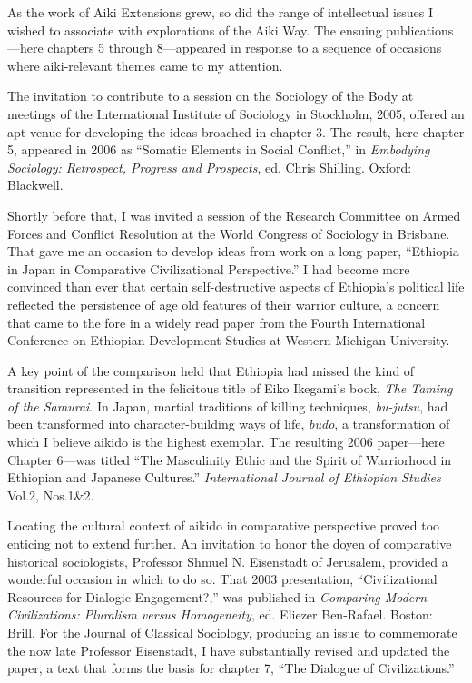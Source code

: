 As the work of Aiki Extensions grew, so did the range of intellectual issues I wished to associate with explorations of the Aiki Way. The ensuing publications---here chapters 5 through 8---appeared in response to a sequence of occasions where aiki-relevant themes came to my attention.

The invitation to contribute to a session on the Sociology of the Body at meetings of the International Institute of Sociology in Stockholm, 2005, offered an apt venue for developing the ideas broached in chapter 3. The result, here chapter 5, appeared in 2006 as ``Somatic Elements in Social Conflict,'' in \emph{Embodying Sociology: Retrospect, Progress and Prospects}, ed. Chris Shilling. Oxford: Blackwell.

Shortly before that, I was invited a session of the Research Committee on Armed Forces and Conflict Resolution at the World Congress of Sociology in Brisbane. That gave me an occasion to develop ideas from work on a long paper, ``Ethiopia in Japan in Comparative Civilizational Perspective.'' I had become more convinced than ever that certain self-destructive aspects of Ethiopia's political life reflected the persistence of age old features of their warrior culture, a concern that came to the fore in a widely read paper from the Fourth International Conference on Ethiopian Development Studies at Western Michigan University.

A key point of the comparison held that Ethiopia had missed the kind of transition represented in the felicitous title of Eiko Ikegami's book, \emph{The Taming of the Samurai}. In Japan, martial traditions of killing techniques, \emph{bu-jutsu}, had been transformed into character-building ways of life, \emph{budo}, a transformation of which I believe aikido is the highest exemplar. The resulting 2006 paper---here Chapter 6---was titled ``The Masculinity Ethic and the Spirit of Warriorhood in Ethiopian and Japanese Cultures.'' \emph{International Journal of Ethiopian Studies} Vol.2, Nos.1\&2.

Locating the cultural context of aikido in comparative perspective proved too enticing not to extend further. An invitation to honor the doyen of comparative historical sociologists, Professor Shmuel N. Eisenstadt of Jerusalem, provided a wonderful occasion in which to do so. That 2003 presentation, ``Civilizational Resources for Dialogic Engagement?,'' was published in \emph{Comparing Modern Civilizations: Pluralism versus Homogeneity}, ed. Eliezer Ben-Rafael. Boston: Brill. For the Journal of Classical Sociology, producing an issue to commemorate the now late Professor Eisenstadt, I have substantially revised and updated the paper, a text that forms the basis for chapter 7, ``The Dialogue of Civilizations.''

